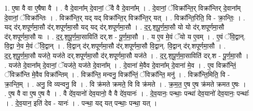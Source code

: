\documentclass[17pt]{extarticle}
\begin{document}
1. ए॒षा वै वा ए॒षैषा वै । . वै दे॒वाना᳚म् दे॒वानां॒ ॅवै वै दे॒वाना᳚म् । . दे॒वानां॒ ॅविक्रा᳚न्ति॒र् विक्रा᳚न्तिर् दे॒वाना᳚म् दे॒वानां॒ ॅविक्रा᳚न्तिः । . विक्रा᳚न्ति॒र् यद् यद् विक्रा᳚न्ति॒र् विक्रा᳚न्ति॒र् यत् । . विक्रा᳚न्ति॒रिति॒ वि - क्रा॒न्तिः॒ । . यद् द॑र्.शपूर्णमा॒सौ द॑र्.शपूर्णमा॒सौ यद् यद् द॑र्.शपूर्णमा॒सौ । . द॒र्॒.श॒पू॒र्ण॒मा॒सौ यो यो द॑र्.शपूर्णमा॒सौ द॑र्.शपूर्णमा॒सौ यः । . द॒र्॒.श॒पू॒र्ण॒मा॒साविति॑ दर्.श - पू॒र्ण॒मा॒सौ । . य ए॒व मे॒वं ॅयो य ए॒वम् । . ए॒वं ॅवि॒द्वान्. वि॒द्वा ने॒व मे॒वं ॅवि॒द्वान् । . वि॒द्वान् द॑र्.शपूर्णमा॒सौ द॑र्.शपूर्णमा॒सौ वि॒द्वान्. वि॒द्वान् द॑र्.शपूर्णमा॒सौ । . द॒र्॒.श॒पू॒र्ण॒मा॒सौ यज॑ते॒ यज॑ते दर्.शपूर्णमा॒सौ द॑र्.शपूर्णमा॒सौ यज॑ते । . द॒र्॒.श॒पू॒र्ण॒मा॒साविति॑ दर्.श - पू॒र्ण॒मा॒सौ । . यज॑ते दे॒वाना᳚म् दे॒वानां॒ ॅयज॑ते॒ यज॑ते दे॒वाना᳚म् । . दे॒वाना॑ मे॒वैव दे॒वाना᳚म् दे॒वाना॑ मे॒व । . ए॒व विक्रा᳚न्तिं॒ ॅविक्रा᳚न्ति मे॒वैव विक्रा᳚न्तिम् । . विक्रा᳚न्ति॒ मन्वनु॒ विक्रा᳚न्तिं॒ ॅविक्रा᳚न्ति॒ मनु॑ । . विक्रा᳚न्ति॒मिति॒ वि - क्रा॒न्ति॒म् । . अनु॒ वि व्यन्वनु॒ वि । . वि क्र॑मते क्रमते॒ वि वि क्र॑मते । . क्र॒म॒त॒ ए॒ष ए॒ष क्र॑मते क्रमत ए॒षः । . ए॒ष वै वा ए॒ष ए॒ष वै । . वै दे॑व॒यानो॑ देव॒यानो॒ वै वै दे॑व॒यानः॑ । . दे॒व॒यानः॒ पन्थाः॒ पन्था॑ देव॒यानो॑ देव॒यानः॒ पन्थाः᳚ । . दे॒व॒यान॒ इति॑ देव - यानः॑ । . पन्था॒ यद् यत् पन्थाः॒ पन्था॒ यत् । \newline
\end{document}

